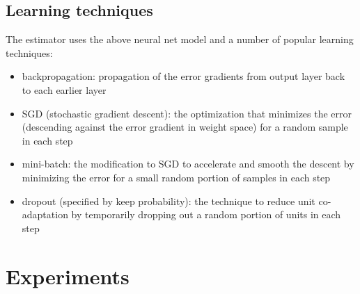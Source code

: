 \documentclass{article}
\begin{document}
\subsection{Learning techniques}
The estimator uses the above neural net model and a number of popular learning 
techniques:
\begin{itemize}
	\item backpropagation: propagation of the error gradients from output layer 
	back to each earlier layer \cite{rumelhart1988learning}
	\item SGD (stochastic gradient descent): the optimization that minimizes 
	the error (descending against the error gradient in weight space) for a 
	random sample in each step \cite{lecun2012efficient}
	\item mini-batch: the modification to SGD to accelerate and smooth the 
	descent by minimizing the error for a small random portion of samples in 
	each step \cite{mairal2010online}
	\item dropout (specified by keep probability): the technique to reduce unit 
	co-adaptation by temporarily dropping out a random portion of units in each 
	step \cite{srivastava2014dropout}
\end{itemize}

\section{Experiments}
\end{document}
